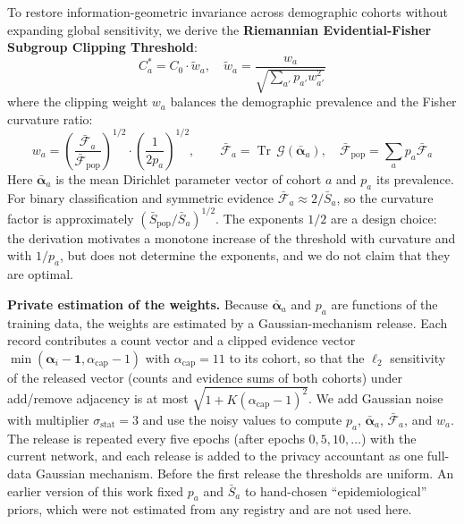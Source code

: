 \documentclass[3p,12pt]{elsarticle}
\theoremstyle{plain}
\theoremstyle{definition}
\begin{document}
To restore information-geometric invariance across demographic cohorts without expanding global sensitivity, we derive the \textbf{Riemannian Evidential-Fisher Subgroup Clipping Threshold}:
\begin{equation}
    C_a^* = C_0 \cdot \tilde{w}_a, \quad \tilde{w}_a = \frac{w_a}{\sqrt{\sum_{a'} p_{a'} w_{a'}^2}}
\end{equation}
where the clipping weight $w_a$ balances the demographic prevalence and the Fisher curvature ratio:
\begin{equation}
    w_a = \left( \frac{\bar{\mathcal{F}}_a}{\bar{\mathcal{F}}_{\text{pop}}} \right)^{1/2} \cdot \left( \frac{1}{2 p_a} \right)^{1/2}, \qquad \bar{\mathcal{F}}_a = \operatorname{Tr}\,\mathcal{G}(\bar{\boldsymbol{\alpha}}_a), \quad \bar{\mathcal{F}}_{\text{pop}} = \sum_a p_a \bar{\mathcal{F}}_a
\end{equation}
Here $\bar{\boldsymbol{\alpha}}_a$ is the mean Dirichlet parameter vector of cohort $a$ and $p_a$ its prevalence. For binary classification and symmetric evidence $\bar{\mathcal{F}}_a \approx 2/\bar{S}_a$, so the curvature factor is approximately $(\bar{S}_{\text{pop}}/\bar{S}_a)^{1/2}$. The exponents $1/2$ are a design choice: the derivation motivates a monotone increase of the threshold with curvature and with $1/p_a$, but does not determine the exponents, and we do not claim that they are optimal.

\noindent \textbf{Private estimation of the weights.} Because $\bar{\boldsymbol{\alpha}}_a$ and $p_a$ are functions of the training data, the weights are estimated by a Gaussian-mechanism release. Each record contributes a count vector and a clipped evidence vector $\min(\boldsymbol{\alpha}_i - \mathbf{1}, \alpha_{\text{cap}} - 1)$ with $\alpha_{\text{cap}} = 11$ to its cohort, so that the $\ell_2$ sensitivity of the released vector (counts and evidence sums of both cohorts) under add/remove adjacency is at most $\sqrt{1 + K(\alpha_{\text{cap}}-1)^2}$. We add Gaussian noise with multiplier $\sigma_{\text{stat}} = 3$ and use the noisy values to compute $p_a$, $\bar{\boldsymbol{\alpha}}_a$, $\bar{\mathcal{F}}_a$, and $w_a$. The release is repeated every five epochs (after epochs $0, 5, 10, \dots$) with the current network, and each release is added to the privacy accountant as one full-data Gaussian mechanism. Before the first release the thresholds are uniform. An earlier version of this work fixed $p_a$ and $\bar{S}_a$ to hand-chosen ``epidemiological'' priors, which were not estimated from any registry and are not used here.
\end{document}
